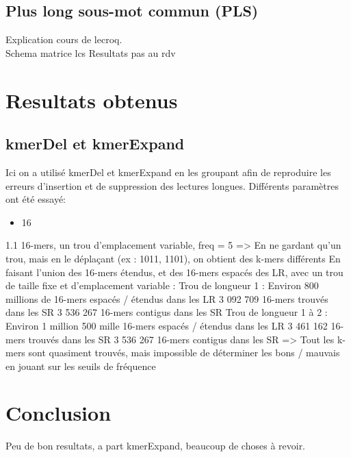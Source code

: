 \documentclass{report}
\begin{document}
    \section{Plus long sous-mot commun (PLS)}
      Explication cours de lecroq.\\
      Schema matrice lcs
      Resultats pas au rdv
    \newpage
  \chapter{Resultats obtenus}
    \section{kmerDel et kmerExpand}
      Ici on a utilisé kmerDel et kmerExpand en les groupant afin de reproduire les erreurs d'insertion et de suppression des lectures longues. Différents paramètres ont été essayé:
      \begin{itemize}
        \item 16
      \end{itemize}
  1.1 16-mers, un trou d’emplacement variable, freq = 5
=> En ne gardant qu’un trou, mais en le déplaçant (ex : 1011, 1101), on obtient des
k-mers différents
En faisant l’union des 16-mers étendus, et des 16-mers espacés des LR, avec un trou
de taille fixe et d’emplacement variable :
Trou de longueur 1 :
Environ 800 millions de 16-mers espacés / étendus dans les LR
3 092 709 16-mers trouvés dans les SR
3 536 267 16-mers contigus dans les SR
Trou de longueur 1 à 2 :
Environ 1 million 500 mille 16-mers espacés / étendus dans les LR
3 461 162 16-mers trouvés dans les SR
3 536 267 16-mers contigus dans les SR
=> Tout les k-mers sont quasiment trouvés, mais impossible de déterminer les bons /
mauvais en jouant sur les seuils de fréquence
  \chapter{Conclusion}
    Peu de bon resultats, a part kmerExpand, beaucoup de choses à revoir.
    \newpage
  
  
\end{document}
